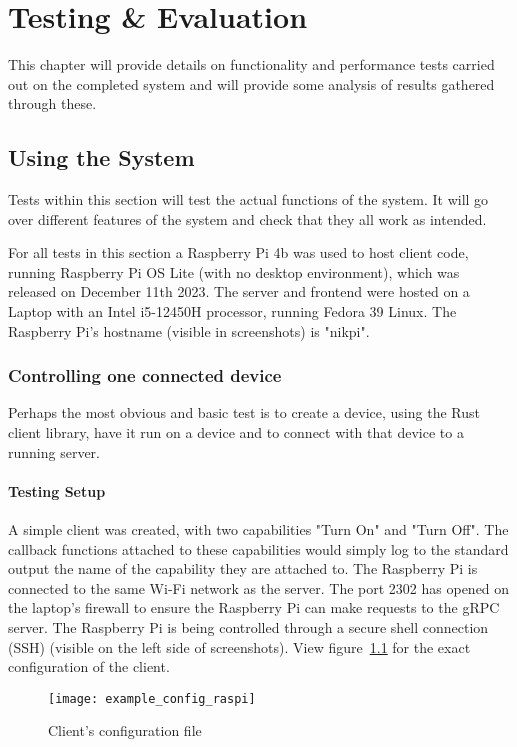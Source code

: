 \chapter{Testing \& Evaluation} \label{cha:testing}
This chapter will provide details on functionality and performance tests carried out on the completed system and will provide some analysis of results gathered through these. 

\section{Using the System}
Tests within this section will test the actual functions of the system. It will go over different features of the system and check that they all work as intended.

For all tests in this section a Raspberry Pi 4b was used to host client code, running Raspberry Pi OS Lite (with no desktop environment), which was released on December 11th 2023. The server and frontend were hosted on a Laptop with an Intel i5-12450H processor, running Fedora 39 Linux. The Raspberry Pi's hostname (visible in screenshots) is "nikpi".
\subsection{Controlling one connected device} \label{cha:testing:onedevice}
Perhaps the most obvious and basic test is to create a device, using the Rust client library, have it run on a device and to connect with that device to a running server. 

\subsubsection{Testing Setup}
A simple client was created, with two capabilities "Turn On" and "Turn Off". The callback functions attached to these capabilities would simply log to the standard output the name of the capability they are attached to. The Raspberry Pi is connected to the same Wi-Fi network as the server. The port 2302 has opened on the laptop's firewall to ensure the Raspberry Pi can make requests to the gRPC server. The Raspberry Pi is being controlled through a secure shell connection (SSH) (visible on the left side of screenshots). View figure~\ref{fig:example_config_raspi} for the exact configuration of the client.
\begin{figure}[h]
\caption{Client's configuration file}
\texttt{[image: example\_config\_raspi]}
\label{fig:example_config_raspi}
\end{figure}

